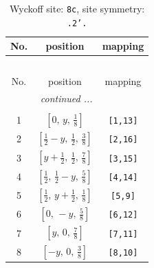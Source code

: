\documentclass[fleqn,8pt]{jsarticle}
\begin{document}
\begin{longtable}{ccc}
\caption{Wyckoff site: {\tt 8c}, site symmetry: {\tt .2'.}}
 \\
 \hline \hline
No. & position & mapping \\ \hline \endfirsthead

\multicolumn{2}{l}{\tablename\ \thetable{}} \\
 \hline \hline
No. & position & mapping \\ \hline \endhead

 \hline \hline
\multicolumn{2}{r}{\footnotesize\it continued ...} \\ \endfoot

 \hline \hline
\multicolumn{2}{r}{} \\ \endlastfoot

1 & $\left[ 0,\, y,\, \frac{1}{8} \right]$ & {\tt [1,13]} \\ \hline
2 & $\left[ \frac{1}{2} - y,\, \frac{1}{2},\, \frac{3}{8} \right]$ & {\tt [2,16]} \\ \hline
3 & $\left[ y + \frac{1}{2},\, \frac{1}{2},\, \frac{7}{8} \right]$ & {\tt [3,15]} \\ \hline
4 & $\left[ \frac{1}{2},\, \frac{1}{2} - y,\, \frac{5}{8} \right]$ & {\tt [4,14]} \\ \hline
5 & $\left[ \frac{1}{2},\, y + \frac{1}{2},\, \frac{1}{8} \right]$ & {\tt [5,9]} \\ \hline
6 & $\left[ 0,\, - y,\, \frac{5}{8} \right]$ & {\tt [6,12]} \\ \hline
7 & $\left[ y,\, 0,\, \frac{7}{8} \right]$ & {\tt [7,11]} \\ \hline
8 & $\left[ - y,\, 0,\, \frac{3}{8} \right]$ & {\tt [8,10]} \\
\end{longtable}
\renewcommand{\arraystretch}{1.2}
\end{document}

